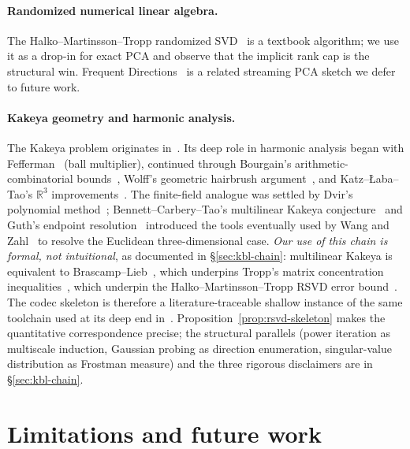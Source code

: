 \documentclass[11pt,a4paper]{article}
\theoremstyle{definition}
\theoremstyle{plain}
\newcommand{\R}{\mathbb{R}}
\begin{document}
\paragraph{Randomized numerical linear algebra.} The Halko--Martinsson--Tropp randomized SVD~\cite{halko-martinsson-tropp} is a textbook algorithm; we use it as a drop-in for exact PCA and observe that the implicit rank cap is the structural win. Frequent Directions~\cite{frequent-directions} is a related streaming PCA sketch we defer to future work.

\paragraph{Kakeya geometry and harmonic analysis.} The Kakeya problem originates in~\cite{kakeya-problem}. Its deep role in harmonic analysis began with Fefferman~\cite{fefferman-ball} (ball multiplier), continued through Bourgain's arithmetic-combinatorial bounds~\cite{bourgain-kakeya}, Wolff's geometric hairbrush argument~\cite{wolff-kakeya}, and Katz--{\L}aba--Tao's $\R^3$ improvements~\cite{katz-laba-tao}. The finite-field analogue was settled by Dvir's polynomial method~\cite{dvir-finite-field}; Bennett--Carbery--Tao's multilinear Kakeya conjecture~\cite{bennett-carbery-tao} and Guth's endpoint resolution~\cite{guth-endpoint} introduced the tools eventually used by Wang and Zahl~\cite{wang-zahl} to resolve the Euclidean three-dimensional case. \emph{Our use of this chain is formal, not intuitional}, as documented in \S\ref{sec:kbl-chain}: multilinear Kakeya is equivalent to Brascamp--Lieb~\cite{bennett-carbery-christ-tao,carbery-valdimarsson}, which underpins Tropp's matrix concentration inequalities~\cite{tropp-matrix-chernoff}, which underpin the Halko--Martinsson--Tropp RSVD error bound~\cite{halko-martinsson-tropp}. The codec skeleton is therefore a literature-traceable shallow instance of the same toolchain used at its deep end in~\cite{wang-zahl}. Proposition~\ref{prop:rsvd-skeleton} makes the quantitative correspondence precise; the structural parallels (power iteration as multiscale induction, Gaussian probing as direction enumeration, singular-value distribution as Frostman measure) and the three rigorous disclaimers are in \S\ref{sec:kbl-chain}.

\section{Limitations and future work}
\label{sec:limitations}
\end{document}
